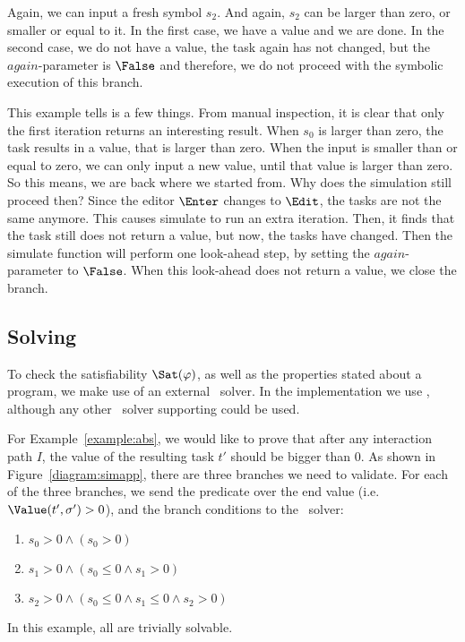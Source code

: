 Again, we can input a fresh symbol $s_2$. And again, $s_2$ can be larger than zero, or smaller or equal to it.
In the first case, we have a value and we are done.
In the second case, we do not have a value, the task again has not changed, but the $\mathit{again}$-parameter is $\False$ and therefore, we do not proceed with the symbolic execution of this branch.

This example tells is a few things.
From manual inspection, it is clear that only the first iteration returns an interesting result.
When $s_0$ is larger than zero, the task results in a value, that is larger than zero.
When the input is smaller than or equal to zero, we can only input a new value, until that value is larger than zero.
So this means, we are back where we started from.
Why does the simulation still proceed then?
Since the editor $\Enter$ changes to $\Edit$, the tasks are not the same anymore.
This causes simulate to run an extra iteration.
Then, it finds that the task still does not return a value, but now, the tasks have changed.
Then the simulate function will perform one look-ahead step, by setting the $\mathit{again}$-parameter to $\False$.
When this look-ahead does not return a value, we close the branch.



\subsection{Solving}

To check the satisfiability $\Sat(\phi)$, as well as the properties stated about a program,
we make use of an external \SMT~solver.
In the implementation we use \ZTHREE,
although any other \SMT~solver supporting \SMTLIB could be used.

For Example~\ref{example:abs}, we would like to prove that after any interaction path $I$,
the value of the resulting task $t'$ should be bigger than $0$.
As shown in Figure~\ref{diagram:simapp}, there are three branches we need to validate.
For each of the three branches,
we send the predicate over the end value (i.e. $\Value(t',\sigma') > 0$),
and the branch conditions to the \SMT~solver:
\begin{enumerate}
  \item $s_0 > 0  \land  (s_0 > 0)$
  \item $s_1 > 0  \land  (s_0 \leq 0 \land s_1 > 0)$
  \item $s_2 > 0  \land  (s_0 \leq 0 \land s_1 \leq 0 \land s_2 > 0)$
\end{enumerate}
In this example, all are trivially solvable.



